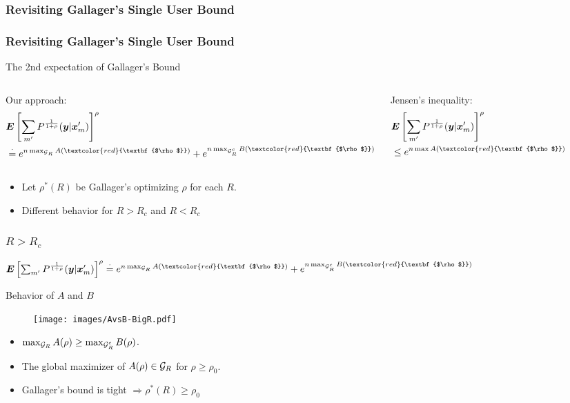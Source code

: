 \documentclass[mathserif]{beamer}
\newcommand {\exe} {\stackrel{\cdot} {=}}
\newcommand {\bx} {\mbox{\boldmath $x$}}
\newcommand {\by} {\mbox{\boldmath $y$}}
\newcommand {\bE} {\mbox{\boldmath $E$}}
\newcommand{\calG}{{\cal G}}
\begin{document}
\subsubsection{Revisiting Gallager's Single User Bound}
\begin{frame}
\frametitle{Revisiting Gallager's Single User Bound}
\begin{block}{The 2nd expectation of Gallager's Bound}
\begin{columns}
\begin{exampleblock}{Our approach:}
\begin{align*}
    &\bE \left[\sum_{m'}P^{\frac 1 {1+\rho}}(\by|\bx_m')\right]^{\rho}\\
    &\exe e^{n\max_{\calG_R}A(\textcolor{red}{\textbf{$\rho$}})} + e^{n\max_{\calG^c_R}B(\textcolor{red}{\textbf{$\rho$}})}
\end{align*}
\end{exampleblock}
\begin{exampleblock}{Jensen's inequality:}
\begin{align*}
    &\bE \left[\sum_{m'}P^{\frac 1 {1+\rho}}(\by|\bx_m')\right]^{\rho}\\
    &\leq e^{n\max A(\textcolor{red}{\textbf{$\rho$}})}
\end{align*}
\end{exampleblock}
\end{columns}
\end{block}
\begin{itemize}
\item    Let $\rho^*(R)$ be Gallager's optimizing $\rho$ for each $R$.
\item   Different behavior for $R>R_c$ and $R<R_c$
\end{itemize}
\end{frame}

\begin{frame}
\frametitle{$R>R_c$}
$\bE \left[\sum_{m'}P^{\frac 1 {1+\rho}}(\by|\bx_m')\right]^{\rho} \exe e^{n\max_{\calG_R}A(\textcolor{red}{\textbf{$\rho$}})}+e^{n\max_{\calG^c_R}B(\textcolor{red}{\textbf{$\rho$}})}$
\begin{block}{Behavior of $A$ and $B$}
\begin{figure}[htp]
\centering
\texttt{[image: images/AvsB-BigR.pdf]}
\end{figure}
\end{block}
\begin{itemize}
\item $\max_{\calG_R}A(\rho)\geq\max_{\calG^c_R}B(\rho)$.
\item The global maximizer of $A(\rho)\in\calG_R$ for $\rho\geq\rho_0$.
\item Gallager's bound is tight $\Rightarrow\rho^*(R)\geq \rho_0$
\end{itemize}
\end{frame}
\end{document}
